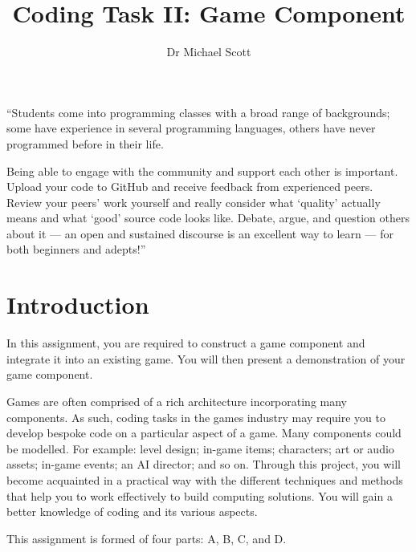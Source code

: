 \documentclass{../fal_assignment}
\title{Coding Task II: Game Component}
\author{Dr Michael Scott}
\begin{document}
\maketitle
\begin{marginquote}
    ``Students come into programming classes with a broad range of backgrounds;
    some have experience in several programming languages, others have never programmed before in their life.
    
    Being able to engage with the community and support each other is important.
    Upload your code to GitHub and receive feedback from experienced peers.
    Review your peers' work yourself and really consider what `quality' actually means
    and what `good' source code looks like.
    Debate, argue, and question others about it ---
    an open and sustained discourse is an excellent way to learn ---
    for both beginners and adepts!''
\end{marginquote}
\section*{Introduction}

In this assignment, you are required to construct a game component and integrate it into an existing game. You will then present a demonstration of your game component.

Games are often comprised of a rich architecture incorporating many components. As such, coding tasks in the games industry may require you to develop bespoke code on a particular aspect of a game. Many components could be modelled. For example: level design; in-game items; characters; art or audio assets; in-game events; an AI director; and so on. Through this project, you will become acquainted in a practical way with the different techniques and methods that help you to work effectively to build computing solutions. You will gain a better knowledge of coding and its various aspects.

This assignment is formed of four parts: A, B, C, and D.
\end{document}
